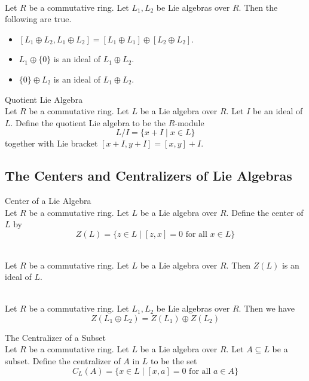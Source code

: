 \documentclass[a4paper]{article}
\begin{document}
\begin{prp}{}{}\\
Let $R$ be a commutative ring. Let $L_1,L_2$ be Lie algebras over $R$. Then the following are true. 
\begin{itemize}
\item $[L_1\oplus L_2,L_1\oplus L_2]=[L_1\oplus L_1]\oplus[L_2\oplus L_2]$. 
\item $L_1\oplus\{0\}$ is an ideal of $L_1\oplus L_2$. 
\item $\{0\}\oplus L_2$ is an ideal of $L_1\oplus L_2$. 
\end{itemize}
\end{prp}

\begin{defn}{Quotient Lie Algebra}{}\\
Let $R$ be a commutative ring. Let $L$ be a Lie algebra over $R$. Let $I$ be an ideal of $L$. Define the quotient Lie algebra to be the $R$-module $$L/I=\{x+I\;|\;x\in L\}$$ together with Lie bracket $[x+I,y+I]=[x,y]+I$. 
\end{defn}

\subsection{The Centers and Centralizers of Lie Algebras}
\begin{defn}{Center of a Lie Algebra}{}\\
Let $R$ be a commutative ring. Let $L$ be a Lie algebra over $R$. Define the center of $L$ by $$Z(L)=\{z\in L\;|\;[z,x]=0\text{ for all }x\in L\}$$
\end{defn}

\begin{lmm}{}{}\\
Let $R$ be a commutative ring. Let $L$ be a Lie algebra over $R$. Then $Z(L)$ is an ideal of $L$. 
\end{lmm}

\begin{prp}{}{}\\
Let $R$ be a commutative ring. Let $L_1,L_2$ be Lie algebras over $R$. Then we have $$Z(L_1\oplus L_2)=Z(L_1)\oplus Z(L_2)$$
\end{prp}

\begin{defn}{The Centralizer of a Subset}{}\\
Let $R$ be a commutative ring. Let $L$ be a Lie algebra over $R$. Let $A\subseteq L$ be a subset. Define the centralizer of $A$ in $L$ to be the set $$C_L(A)=\{x\in L\;|\;[x,a]=0\text{ for all }a\in A\}$$
\end{defn}
\end{document}
